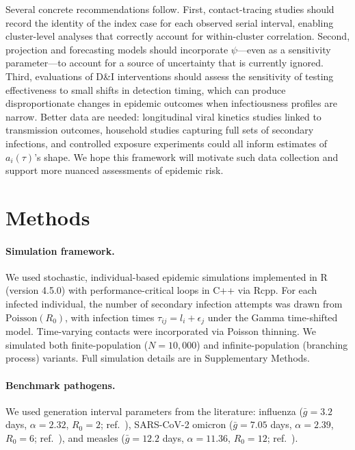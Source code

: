 Several concrete recommendations follow. First, contact-tracing studies should record the identity of the index case for each observed serial interval, enabling cluster-level analyses that correctly account for within-cluster correlation. Second, projection and forecasting models should incorporate $\psi$---even as a sensitivity parameter---to account for a source of uncertainty that is currently ignored. Third, evaluations of D\&I interventions should assess the sensitivity of testing effectiveness to small shifts in detection timing, which can produce disproportionate changes in epidemic outcomes when infectiousness profiles are narrow. Better data are needed: longitudinal viral kinetics studies linked to transmission outcomes, household studies capturing full sets of secondary infections, and controlled exposure experiments could all inform estimates of $a_i(\tau)$'s shape. We hope this framework will motivate such data collection and support more nuanced assessments of epidemic risk.


\section{Methods}

\paragraph{Simulation framework.}
We used stochastic, individual-based epidemic simulations implemented in R (version 4.5.0) with performance-critical loops in C++ via Rcpp. For each infected individual, the number of secondary infection attempts was drawn from $\text{Poisson}(R_0)$, with infection times $\tau_{ij} = l_i + \epsilon_j$ under the Gamma time-shifted model. Time-varying contacts were incorporated via Poisson thinning. We simulated both finite-population ($N = 10{,}000$) and infinite-population (branching process) variants. Full simulation details are in Supplementary Methods.

\paragraph{Benchmark pathogens.}
We used generation interval parameters from the literature: influenza ($\bar{g} = 3.2$ days, $\alpha = 2.32$, $R_0 = 2$; ref.~), SARS-CoV-2 omicron ($\bar{g} = 7.05$ days, $\alpha = 2.39$, $R_0 = 6$; ref.~), and measles ($\bar{g} = 12.2$ days, $\alpha = 11.36$, $R_0 = 12$; ref.~).

